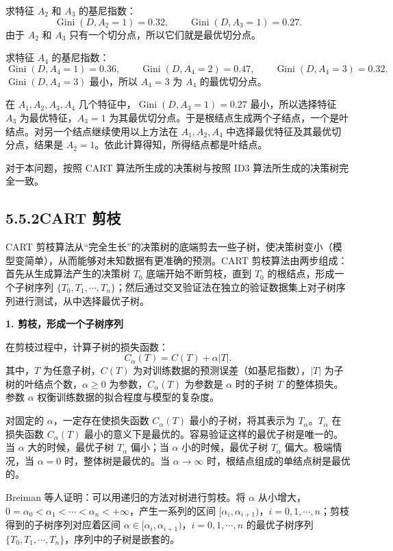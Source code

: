 \documentclass[UTF8,12pt,a4paper,fontset=fandol]{ctexart}
\begin{document}
求特征 $A_2$ 和 $A_3$ 的基尼指数：
\[
  \operatorname{Gini}(D,A_2=1)=0.32,\qquad
  \operatorname{Gini}(D,A_3=1)=0.27.
\]
由于 $A_2$ 和 $A_3$ 只有一个切分点，所以它们就是最优切分点。

求特征 $A_4$ 的基尼指数：
\[
  \operatorname{Gini}(D,A_4=1)=0.36,\qquad
  \operatorname{Gini}(D,A_4=2)=0.47,\qquad
  \operatorname{Gini}(D,A_4=3)=0.32.
\]
$\operatorname{Gini}(D,A_4=3)$ 最小，所以 $A_4=3$ 为 $A_4$ 的最优切分点。

在 $A_1,A_2,A_3,A_4$ 几个特征中，$\operatorname{Gini}(D,A_3=1)=0.27$ 最小，所以选择特征 $A_3$ 为最优特征，$A_3=1$ 为其最优切分点。于是根结点生成两个子结点，一个是叶结点。对另一个结点继续使用以上方法在 $A_1,A_2,A_4$ 中选择最优特征及其最优切分点，结果是 $A_2=1$。依此计算得知，所得结点都是叶结点。

对于本问题，按照 CART 算法所生成的决策树与按照 ID3 算法所生成的决策树完全一致。

\subsection*{5.5.2\quad CART 剪枝}

CART 剪枝算法从“完全生长”的决策树的底端剪去一些子树，使决策树变小（模型变简单），从而能够对未知数据有更准确的预测。CART 剪枝算法由两步组成：首先从生成算法产生的决策树 $T_0$ 底端开始不断剪枝，直到 $T_0$ 的根结点，形成一个子树序列 $\{T_0,T_1,\cdots,T_n\}$；然后通过交叉验证法在独立的验证数据集上对子树序列进行测试，从中选择最优子树。

\noindent\textbf{1. 剪枝，形成一个子树序列}

在剪枝过程中，计算子树的损失函数：
\begin{equation}
  C_\alpha(T)=C(T)+\alpha|T|.
  \tag{5.26}
\end{equation}
其中，$T$ 为任意子树，$C(T)$ 为对训练数据的预测误差（如基尼指数），$|T|$ 为子树的叶结点个数，$\alpha\ge0$ 为参数，$C_\alpha(T)$ 为参数是 $\alpha$ 时的子树 $T$ 的整体损失。参数 $\alpha$ 权衡训练数据的拟合程度与模型的复杂度。

对固定的 $\alpha$，一定存在使损失函数 $C_\alpha(T)$ 最小的子树，将其表示为 $T_\alpha$。$T_\alpha$ 在损失函数 $C_\alpha(T)$ 最小的意义下是最优的。容易验证这样的最优子树是唯一的。当 $\alpha$ 大的时候，最优子树 $T_\alpha$ 偏小；当 $\alpha$ 小的时候，最优子树 $T_\alpha$ 偏大。极端情况，当 $\alpha=0$ 时，整体树是最优的。当 $\alpha\to\infty$ 时，根结点组成的单结点树是最优的。

Breiman 等人证明：可以用递归的方法对树进行剪枝。将 $\alpha$ 从小增大，$0=\alpha_0<\alpha_1<\cdots<\alpha_n<+\infty$，产生一系列的区间 $[\alpha_i,\alpha_{i+1})$，$i=0,1,\cdots,n$；剪枝得到的子树序列对应着区间 $\alpha\in[\alpha_i,\alpha_{i+1})$，$i=0,1,\cdots,n$ 的最优子树序列 $\{T_0,T_1,\cdots,T_n\}$，序列中的子树是嵌套的。
\end{document}
